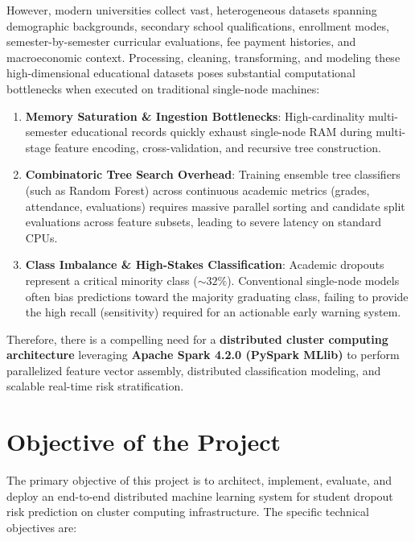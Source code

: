 \documentclass[11pt,a4paper]{article}
\begin{document}
However, modern universities collect vast, heterogeneous datasets spanning demographic backgrounds, secondary school qualifications, enrollment modes, semester-by-semester curricular evaluations, fee payment histories, and macroeconomic context. Processing, cleaning, transforming, and modeling these high-dimensional educational datasets poses substantial computational bottlenecks when executed on traditional single-node machines:
\begin{enumerate}[label=(\alph*)]
    \item \textbf{Memory Saturation \& Ingestion Bottlenecks}: High-cardinality multi-semester educational records quickly exhaust single-node RAM during multi-stage feature encoding, cross-validation, and recursive tree construction.
    \item \textbf{Combinatoric Tree Search Overhead}: Training ensemble tree classifiers (such as Random Forest) across continuous academic metrics (grades, attendance, evaluations) requires massive parallel sorting and candidate split evaluations across feature subsets, leading to severe latency on standard CPUs.
    \item \textbf{Class Imbalance \& High-Stakes Classification}: Academic dropouts represent a critical minority class ($\sim 32\%$). Conventional single-node models often bias predictions toward the majority graduating class, failing to provide the high recall (sensitivity) required for an actionable early warning system.
\end{enumerate}

Therefore, there is a compelling need for a \textbf{distributed cluster computing architecture} leveraging \textbf{Apache Spark 4.2.0 (PySpark MLlib)} to perform parallelized feature vector assembly, distributed classification modeling, and scalable real-time risk stratification.

\section{Objective of the Project}
\label{sec:objective}

The primary objective of this project is to architect, implement, evaluate, and deploy an end-to-end distributed machine learning system for student dropout risk prediction on cluster computing infrastructure. The specific technical objectives are:
\end{document}
